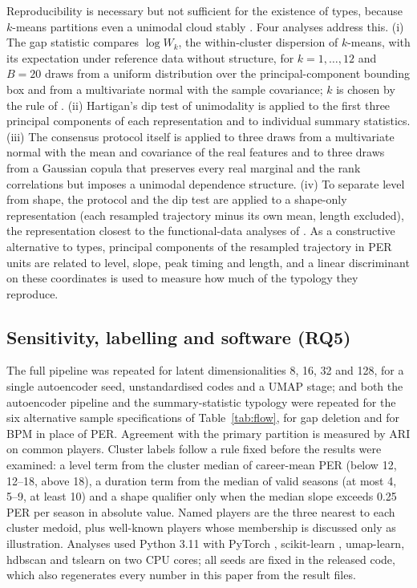 Reproducibility is necessary but not sufficient for the existence of types, because $k$-means partitions even a unimodal cloud stably \citep{senbabaoglu2014}. Four analyses address this. (i) The gap statistic \citep{tibshirani2001} compares $\log W_k$, the within-cluster dispersion of $k$-means, with its expectation under reference data without structure, for $k=1,\dots,12$ and $B=20$ draws from a uniform distribution over the principal-component bounding box and from a multivariate normal with the sample covariance; $k$ is chosen by the rule of \citet{tibshirani2001}. (ii) Hartigan's dip test of unimodality \citep{hartigan1985} is applied to the first three principal components of each representation and to individual summary statistics. (iii) The consensus protocol itself is applied to three draws from a multivariate normal with the mean and covariance of the real features and to three draws from a Gaussian copula that preserves every real marginal and the rank correlations but imposes a unimodal dependence structure. (iv) To separate level from shape, the protocol and the dip test are applied to a shape-only representation (each resampled trajectory minus its own mean, length excluded), the representation closest to the functional-data analyses of \citet{wakim2014}. As a constructive alternative to types, principal components of the resampled trajectory in PER units are related to level, slope, peak timing and length, and a linear discriminant on these coordinates is used to measure how much of the typology they reproduce.

\subsection{Sensitivity, labelling and software (RQ5)}\label{sec:sens_methods}

The full pipeline was repeated for latent dimensionalities 8, 16, 32 and 128, for a single autoencoder seed, unstandardised codes and a UMAP stage; and both the autoencoder pipeline and the summary-statistic typology were repeated for the six alternative sample specifications of Table~\ref{tab:flow}, for gap deletion and for BPM in place of PER. Agreement with the primary partition is measured by ARI on common players. Cluster labels follow a rule fixed before the results were examined: a level term from the cluster median of career-mean PER (below 12, 12--18, above 18), a duration term from the median of valid seasons (at most 4, 5--9, at least 10) and a shape qualifier only when the median slope exceeds 0.25 PER per season in absolute value. Named players are the three nearest to each cluster medoid, plus well-known players whose membership is discussed only as illustration. Analyses used Python 3.11 with PyTorch \citep{paszke2019}, scikit-learn \citep{pedregosa2011}, umap-learn, hdbscan \citep{mcinnes2017hdbscan} and tslearn \citep{tavenard2020} on two CPU cores; all seeds are fixed in the released code, which also regenerates every number in this paper from the result files.
